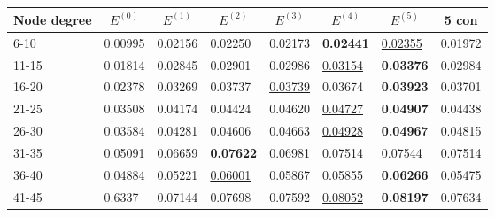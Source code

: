 \begin{table*}[]
    \centering
    \begin{tabular}{|l|l|l|l|l|l|l||l|}
        \hline
        Node degree & \multicolumn{1}{c|}{$E^{(0)}$} & \multicolumn{1}{c|}{$E^{(1)}$} & \multicolumn{1}{c|}{$E^{(2)}$} & \multicolumn{1}{c|}{$E^{(3)}$} & \multicolumn{1}{c|}{$E^{(4)}$} & \multicolumn{1}{c||}{$E^{(5)}$} & \multicolumn{1}{c|}{5 con} \\ \hline
        6-10        & 0.00995                        & 0.02156                        & 0.02250                        & 0.02173                        & \textbf{0.02441}               & \underline{0.02355}             & 0.01972                    \\ \hline
        11-15       & 0.01814                        & 0.02845                        & 0.02901                        & 0.02986                        & \underline{0.03154}            & \textbf{0.03376}                & 0.02984                    \\ \hline
        16-20       & 0.02378                        & 0.03269                        & 0.03737                        & \underline{0.03739}            & 0.03674                        & \textbf{0.03923}                & 0.03701                    \\ \hline
        21-25       & 0.03508                        & 0.04174                        & 0.04424                        & 0.04620                        & \underline{0.04727}            & \textbf{0.04907}                & 0.04438                    \\ \hline
        26-30       & 0.03584                        & 0.04281                        & 0.04606                        & 0.04663                        & \underline{0.04928}            & \textbf{0.04967}                & 0.04815                    \\ \hline
        31-35       & 0.05091                        & 0.06659                        & \textbf{0.07622}               & 0.06981                        & 0.07514                        & \underline{0.07544}             & 0.07514                    \\ \hline
        36-40       & 0.04884                        & 0.05221                        & \underline{0.06001}            & 0.05867                        & 0.05855                        & \textbf{0.06266}                & 0.05475                    \\ \hline
        41-45       & 0.6337                         & 0.07144                        & 0.07698                        & 0.07592                        & \underline{0.08052}            & \textbf{0.08197}                & 0.07634                    \\ \hline

\end{tabular}
\end{table*}
